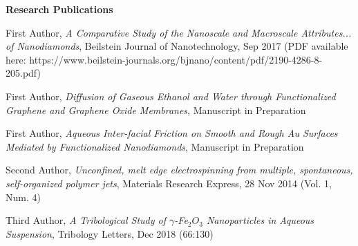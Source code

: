 \documentclass[letterpaper,final]{memoir}
\newcommand{\SmallSep}{\vspace{0.4em}}
\newcommand{\CVSection}[1]
	{\LARGE\textbf{#1}\par
	\SmallSep\normalsize}
\begin{document}

\notoserif \CVSection{Research Publications}
\normalfont

\SmallSep

\begin{compactitem}[\color{Blue}$\circ$]
	 
    \item First Author, \textit{A Comparative Study of the Nanoscale and Macroscale Attributes... of Nanodiamonds}, Beilstein Journal of Nanotechnology, Sep 2017 (PDF available here: https://www.beilstein-journals.org/bjnano/content/pdf/2190-4286-8-205.pdf)
    \SmallSep

    \item First Author, \textit{Diffusion of Gaseous Ethanol and Water through Functionalized Graphene and Graphene Oxide Membranes}, Manuscript in Preparation
    \SmallSep

    \item First Author, \textit{Aqueous Inter-facial Friction on Smooth and Rough Au Surfaces Mediated by Functionalized Nanodiamonds}, Manuscript in Preparation
    \SmallSep
    
    \item Second Author, \textit{Unconfined, melt edge electrospinning from multiple, spontaneous, self-organized polymer jets}, Materials Research Express, 28 Nov 2014 (Vol. 1, Num. 4)
    \SmallSep

    \item Third Author, \textit{A Tribological Study of $\gamma$-Fe$_{2}O_{3}$ Nanoparticles in Aqueous Suspension}, Tribology Letters, Dec 2018 (66:130)
	
\end{compactitem}
\end{document}
